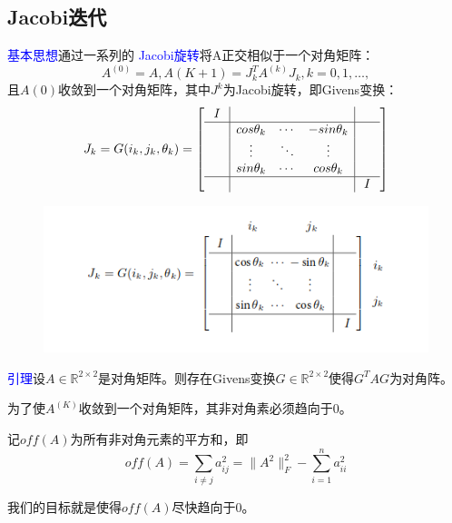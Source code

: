\documentclass[12pt,a4paper]{article}
\begin{document}
\subsection{Jacobi迭代}
\textcolor{blue}{基本思想}\quad 通过一系列的 \textcolor{blue}{Jacobi旋转}将A正交相似于一个对角矩阵：
$$A^{(0)}=A,A{(K+1)}=J_k^TA^{(k)}J_k,k=0,1,…,$$
且$A{(0)}$收敛到一个对角矩阵，其中$J^k$为Jacobi旋转，即Givens变换：
\begin{equation}
J_k=G(i_k,j_k,\theta _k)=\left[
\begin{array}{c|c c c|c} 
I&\quad &\quad &\quad &\quad\\
\hline
\quad &cos\theta _k&\cdots &-sin\theta _k &\quad\\
\quad &\vdots & \ddots &\vdots &\quad \\
\quad &sin\theta _k &\cdots &cos\theta _k &\quad \\
\hline
\quad &\quad &\quad & \quad &I
\end{array}
\right]
\end{equation}
\begin{figure}[H]
	\centering
	\includegraphics[scale=1]{figurest/figure_1.png}
\end{figure}
\textcolor{blue}{引理}\quad 设$A\in\mathbb{R}^{2\times 2}$是对角矩阵。则存在Givens变换$G\in \mathbb{R}^{2\times 2}$使得$G^TAG$为对角阵。

为了使$A^{(K)}$收敛到一个对角矩阵，其非对角素必须趋向于0。

记$off(A)$为所有非对角元素的平方和，即
$$off(A)=\sum_{i\neq j}a_{ij}^2=\|A^2\|_F^2-\sum_{i=1}^na_{ii}^2$$

我们的目标就是使得$off(A)$尽快趋向于0。
\end{document}
